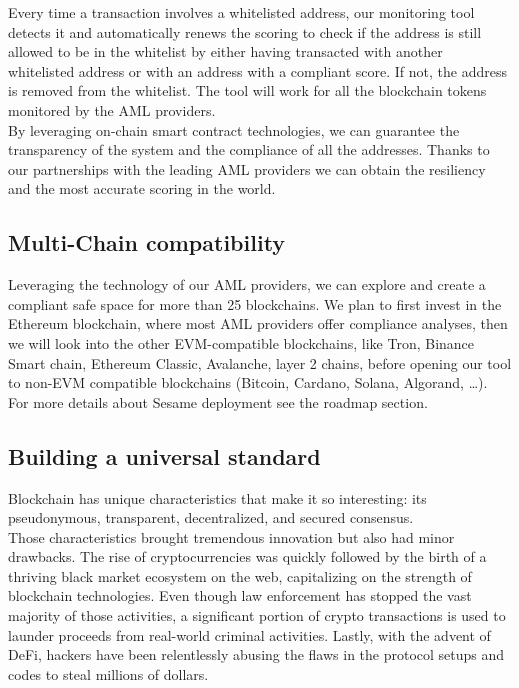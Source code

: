 ﻿\documentclass[a4paper]{article}
\begin{document}
Every time a transaction involves a whitelisted address, our monitoring tool detects it and automatically renews the scoring to check if the address is still allowed to be in the whitelist by either having transacted with another whitelisted address or with an address with a compliant score. If not, the address is removed from the whitelist.
The tool will work for all the blockchain tokens monitored by the AML providers. \\

By leveraging on-chain smart contract technologies, we can guarantee the transparency of the system and the compliance of all the addresses. Thanks to our partnerships with the leading AML providers we can obtain the resiliency and the most accurate scoring in the world.

\subsection{Multi-Chain compatibility}
Leveraging the technology of our AML providers, we can explore and create a compliant safe space for more than 25 blockchains. We plan to first invest in the Ethereum blockchain, where most AML providers offer compliance analyses, then we will look into the other EVM-compatible blockchains, like Tron, Binance Smart chain, Ethereum Classic, Avalanche, layer 2 chains, before opening our tool to non-EVM compatible blockchains (Bitcoin, Cardano, Solana, Algorand, …). For more details about Sesame deployment see the roadmap section. 

\subsection{Building a universal standard}
Blockchain has unique characteristics that make it so interesting: its pseudonymous, transparent, decentralized, and secured consensus. \\

Those characteristics brought tremendous innovation but also had minor drawbacks.  The rise of cryptocurrencies was quickly followed by the birth of a thriving black market ecosystem on the web, capitalizing on the strength of blockchain technologies. Even though law enforcement has stopped the vast majority of those activities, a significant portion of crypto transactions is used to launder proceeds from real-world criminal activities. Lastly, with the advent of DeFi, hackers have been relentlessly abusing the flaws in the protocol setups and codes to steal millions of dollars. \\
\end{document}
